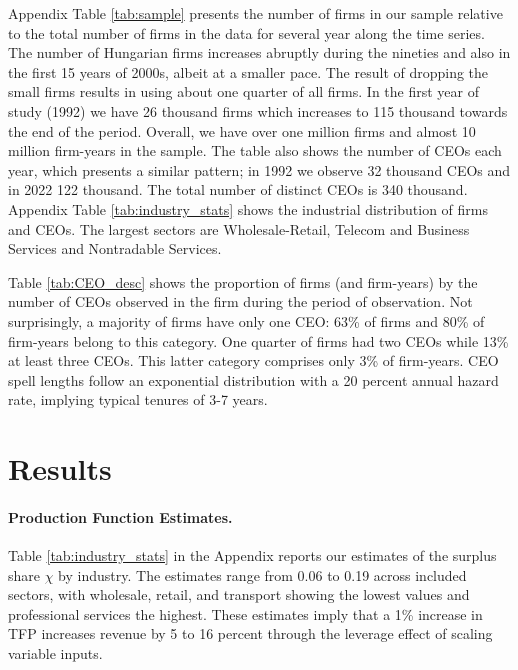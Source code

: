 \documentclass[11pt,a4paper]{article}
\begin{document}
Appendix Table \ref{tab:sample} presents the number of firms in our sample relative to the total number of firms in the data for several year along the time series. The number of Hungarian firms increases abruptly during the nineties and also in the first 15 years of 2000s, albeit at a smaller pace.  The result of dropping the small firms results in using about one quarter of all firms. In the first year of study (1992) we have 26 thousand firms which increases to 115 thousand towards the end of the period. Overall, we have over one million firms and almost 10 million firm-years in the sample. The table also shows the number of CEOs each year, which presents a similar pattern; in 1992 we observe 32 thousand CEOs and in 2022 122 thousand. The total number of distinct CEOs is 340 thousand. Appendix Table \ref{tab:industry_stats} shows the industrial distribution of firms and CEOs. The largest sectors are Wholesale-Retail, Telecom and Business Services and Nontradable Services. 

Table \ref{tab:CEO_desc} shows the proportion of firms (and firm-years) by the number of CEOs observed in the firm during the period of observation. Not surprisingly, a majority of firms have only one CEO: 63\% of firms and 80\% of firm-years belong to this category. One quarter of firms had two CEOs while 13\% at least three CEOs. This latter category comprises only 3\% of firm-years. CEO spell lengths follow an exponential distribution with a 20 percent annual hazard rate, implying typical tenures of 3-7 years.


\section{Results}

\paragraph{Production Function Estimates.} Table \ref{tab:industry_stats} in the Appendix reports our estimates of the surplus share $\chi$ by industry. The estimates range from 0.06 to 0.19 across included sectors, with wholesale, retail, and transport showing the lowest values and professional services the highest. These estimates imply that a 1\% increase in TFP increases revenue by 5 to 16 percent through the leverage effect of scaling variable inputs.

\end{document}
